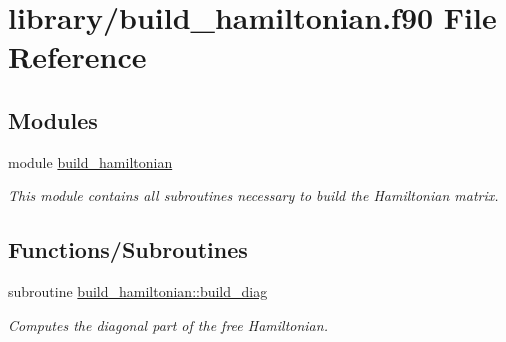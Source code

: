 \hypertarget{build__hamiltonian_8f90}{
\section{library/build\_\-hamiltonian.f90 File Reference}
\label{build__hamiltonian_8f90}
}
\subsection*{Modules}
\begin{DoxyCompactItemize}
\item 
module \hyperlink{namespacebuild__hamiltonian}{build\_\-hamiltonian}


\begin{DoxyCompactList}\small\item\em This module contains all subroutines necessary to build the Hamiltonian matrix. \item\end{DoxyCompactList}\end{DoxyCompactItemize}
\subsection*{Functions/Subroutines}
\begin{DoxyCompactItemize}
\item 
subroutine \hyperlink{namespacebuild__hamiltonian_ab5ac348f3684c47ce811a87c9c33acf7}{build\_\-hamiltonian::build\_\-diag}
\begin{DoxyCompactList}\small\item\em Computes the diagonal part of the free Hamiltonian. \item\end{DoxyCompactList}\end{DoxyCompactItemize}
